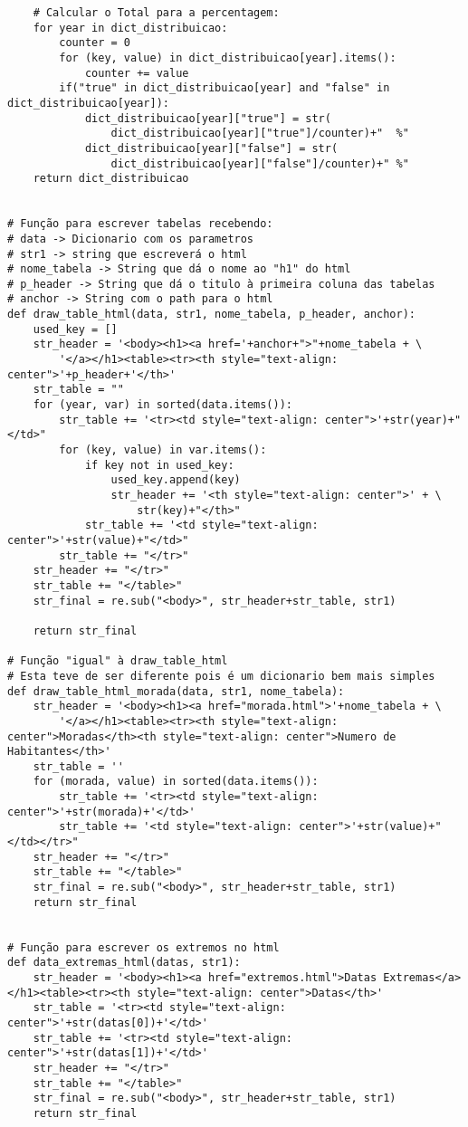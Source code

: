 \documentclass[11pt,a4paper]{report}%
\begin{document}
\begin{verbatim}
    # Calcular o Total para a percentagem:
    for year in dict_distribuicao:
        counter = 0
        for (key, value) in dict_distribuicao[year].items():
            counter += value
        if("true" in dict_distribuicao[year] and "false" in dict_distribuicao[year]):
            dict_distribuicao[year]["true"] = str(
                dict_distribuicao[year]["true"]/counter)+"  %"
            dict_distribuicao[year]["false"] = str(
                dict_distribuicao[year]["false"]/counter)+" %"
    return dict_distribuicao


# Função para escrever tabelas recebendo:
# data -> Dicionario com os parametros
# str1 -> string que escreverá o html
# nome_tabela -> String que dá o nome ao "h1" do html
# p_header -> String que dá o titulo à primeira coluna das tabelas
# anchor -> String com o path para o html
def draw_table_html(data, str1, nome_tabela, p_header, anchor):
    used_key = []
    str_header = '<body><h1><a href='+anchor+">"+nome_tabela + \
        '</a></h1><table><tr><th style="text-align: center">'+p_header+'</th>'
    str_table = ""
    for (year, var) in sorted(data.items()):
        str_table += '<tr><td style="text-align: center">'+str(year)+"</td>"
        for (key, value) in var.items():
            if key not in used_key:
                used_key.append(key)
                str_header += '<th style="text-align: center">' + \
                    str(key)+"</th>"
            str_table += '<td style="text-align: center">'+str(value)+"</td>"
        str_table += "</tr>"
    str_header += "</tr>"
    str_table += "</table>"
    str_final = re.sub("<body>", str_header+str_table, str1)

    return str_final

# Função "igual" à draw_table_html
# Esta teve de ser diferente pois é um dicionario bem mais simples
def draw_table_html_morada(data, str1, nome_tabela):
    str_header = '<body><h1><a href="morada.html">'+nome_tabela + \
        '</a></h1><table><tr><th style="text-align: center">Moradas</th><th style="text-align: center">Numero de Habitantes</th>'
    str_table = ''
    for (morada, value) in sorted(data.items()):
        str_table += '<tr><td style="text-align: center">'+str(morada)+'</td>'
        str_table += '<td style="text-align: center">'+str(value)+"</td></tr>"
    str_header += "</tr>"
    str_table += "</table>"
    str_final = re.sub("<body>", str_header+str_table, str1)
    return str_final


# Função para escrever os extremos no html
def data_extremas_html(datas, str1):
    str_header = '<body><h1><a href="extremos.html">Datas Extremas</a></h1><table><tr><th style="text-align: center">Datas</th>'
    str_table = '<tr><td style="text-align: center">'+str(datas[0])+'</td>'
    str_table += '<tr><td style="text-align: center">'+str(datas[1])+'</td>'
    str_header += "</tr>"
    str_table += "</table>"
    str_final = re.sub("<body>", str_header+str_table, str1)
    return str_final



\end{verbatim}
\end{document}
